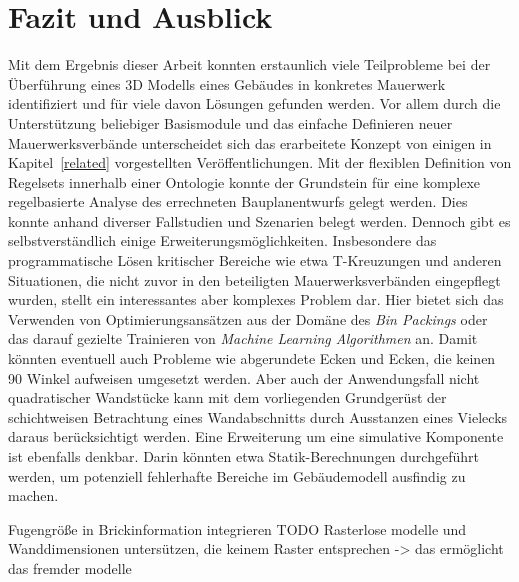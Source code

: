 \chapter{Fazit und Ausblick}
Mit dem Ergebnis dieser Arbeit konnten erstaunlich viele Teilprobleme bei der Überführung eines 3D Modells eines Gebäudes in konkretes Mauerwerk identifiziert und für viele davon Lösungen gefunden werden.
Vor allem durch die Unterstützung beliebiger Basismodule und das einfache Definieren neuer Mauerwerksverbände unterscheidet sich das erarbeitete Konzept von einigen in Kapitel~\ref{related} vorgestellten Veröffentlichungen.
Mit der flexiblen Definition von Regelsets innerhalb einer Ontologie konnte der Grundstein für eine komplexe regelbasierte Analyse des errechneten Bauplanentwurfs gelegt werden.
Dies konnte anhand diverser Fallstudien und Szenarien belegt werden.
Dennoch gibt es selbstverständlich einige Erweiterungsmöglichkeiten.
Insbesondere das programmatische Lösen kritischer Bereiche wie etwa T-Kreuzungen und anderen Situationen, die nicht zuvor in den beteiligten Mauerwerksverbänden eingepflegt wurden, stellt ein interessantes aber komplexes Problem dar.
Hier bietet sich das Verwenden von Optimierungsansätzen aus der Domäne des \textit{Bin Packings} oder das darauf gezielte Trainieren von \textit{Machine Learning Algorithmen} an.
Damit könnten eventuell auch Probleme wie abgerundete Ecken und Ecken, die keinen 90\textdegree{} Winkel aufweisen umgesetzt werden.
Aber auch der Anwendungsfall nicht quadratischer Wandstücke kann mit dem vorliegenden Grundgerüst der schichtweisen Betrachtung eines Wandabschnitts durch \glqq{}Ausstanzen\grqq{} eines Vielecks daraus berücksichtigt werden.
Eine Erweiterung um eine simulative Komponente ist ebenfalls denkbar.
Darin könnten etwa Statik-Berechnungen durchgeführt werden, um potenziell fehlerhafte Bereiche im Gebäudemodell ausfindig zu machen.

Fugengröße in Brickinformation integrieren
TODO Rasterlose modelle und Wanddimensionen untersützen, die keinem Raster entsprechen -> das ermöglicht das fremder modelle